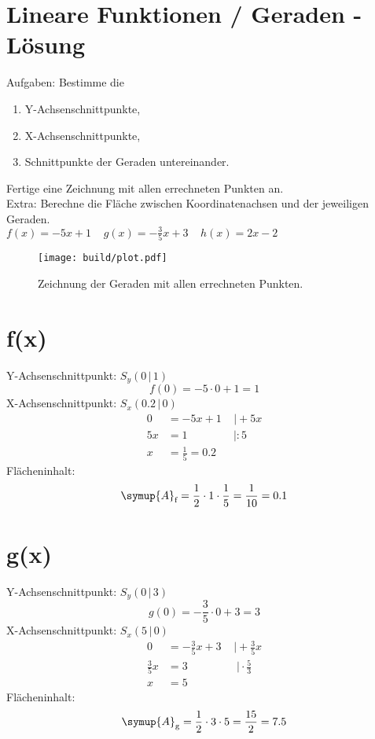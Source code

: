 


\section*{Lineare Funktionen / Geraden - Lösung}

Aufgaben: Bestimme die
\begin{enumerate}
      \item Y-Achsenschnittpunkte,
      \item X-Achsenschnittpunkte,
      \item Schnittpunkte der Geraden untereinander.
\end{enumerate}
Fertige eine Zeichnung mit allen errechneten Punkten an.\\
Extra: Berechne die Fläche zwischen Koordinatenachsen und der jeweiligen Geraden.
\\
$f(x)=-5x+1 \;\;\;\; g(x)=-\frac{3}{5}x+3 \;\;\;\; h(x)=2x-2$

\begin{figure}
      \centering
      \texttt{[image: build/plot.pdf]}
      \caption{Zeichnung der Geraden mit allen errechneten Punkten.}
\end{figure}

\newpage
\section*{f(x)}
Y-Achsenschnittpunkt: $S_y (0\,|\,1)$
\begin{equation}
      f(0)=-5\cdot 0+1=1
\end{equation}
X-Achsenschnittpunkt: $S_x (0.2\,|\,0)$
\begin{align}
      0&=-5x+1\;\;\;\;|\!+\!5x\\
      5x&=1\;\;\;\;\;\;\;\;\;\;\;\;\;\;\;|\!:\!5\\
      x&=\frac{1}{5}=0.2
\end{align}
Flächeninhalt:
\begin{equation}
      \symup{A}_\text{f} = \frac{1}{2}\cdot1\cdot\frac{1}{5}=\frac{1}{10}=0.1
\end{equation}

\section*{g(x)}
Y-Achsenschnittpunkt: $S_y (0\,|\,3)$
\begin{equation}
      g(0)=-\frac{3}{5}\cdot 0+3=3
\end{equation}
X-Achsenschnittpunkt: $S_x (5\,|\,0)$
\begin{align}
      0&=-\frac{3}{5}x+3\;\;\;\;|\!+\!\frac{3}{5}x\\
      \frac{3}{5}x&=3\;\;\;\;\;\;\;\;\;\;\;\;\;\;\;\;|\!\cdot\!\frac{5}{3}\\
      x&=5
\end{align}
Flächeninhalt:
\begin{equation}
      \symup{A}_\text{g} = \frac{1}{2}\cdot3\cdot5=\frac{15}{2}=7.5
\end{equation}

